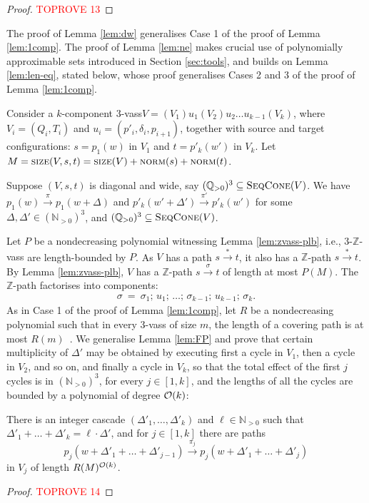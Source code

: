 \documentclass[a4paper, UKenglish, cleveref, autoref, thm-restate]{lipics-v2021}
\newcommand{\sandwich}{polynomially approximable\xspace}
\newcommand{\N}{\mathbb{N}}
\newcommand{\Z}{\mathbb{Z}}
\newcommand{\Q}{\mathbb{Q}}
\newcommand{\Qpos}{\Q_{>0}}
\newcommand{\trans}[1]{\stackrel{#1}{\longrightarrow}}
\newcommand{\tran}{\trans{*}}
\newcommand{\norm}{\textsc{norm}}
\newcommand{\size}{\textsc{size}}
\newcommand{\lb}{length-bounded\xspace}
\newcommand{\OO}{{\cal O}}
\newcommand{\vass}{{\sc vass}\xspace}
\newcommand{\tvass}{\parvass 3}
\newcommand{\tzvass}{\parzvass 3}
\newcommand{\parvass}[1]{{$#1$-\vass}\xspace}
\newcommand{\parzvass}[1]{{$#1$-$\Z$-\vass}\xspace}
\newcommand{\ktvass}{(V_1) u_1 (V_2) u_2 \ldots u_{k-1} (V_k)}
\newcommand{\setfromto}[2]{[#1, #2]}
\newcommand{\setto}[1]{\setfromto 1 {#1}}
\newcommand{\seqcone}[1]{\textsc{SeqCone}(#1)}
\newcommand{\Npos}{\N_{>0}}
\begin{document}
\begin{proof}\textcolor{red}{TOPROVE 13}\end{proof}


The proof of Lemma \ref{lem:dw} generalises Case 1 of the proof of Lemma \ref{lem:1comp}.
The proof of Lemma \ref{lem:ne} makes crucial use of \sandwich sets introduced
in Section \ref{sec:tools}, and builds on 
Lemma \ref{lem:len-eq}, stated below, whose proof 
generalises Cases 2 and 3 of the proof of Lemma \ref{lem:1comp}.


\begin{appendixproof}
Consider a $k$-component \tvass  $V = \ktvass$,
where $V_i = (Q_i, T_i)$ and $u_i = (p'_i, \delta_i, p_{i+1})$,
together with source and target configurations: 
$s=p_1(w)$ in $V_1$ and $t=p'_k(w')$ in $V_k$.
Let $M = \size(V, s, t) = \size(V) + \norm(s) + \norm(t)$.

Suppose $(V, s, t)$ is diagonal and wide, say $(\Qpos)^3 \subseteq \seqcone{V}$.
We have
$p_1(w) \trans\pi p_1(w+\Delta)$ and
$p'_k(w'+\Delta')\trans{\pi'} p'_k(w')$  for some $\Delta,\Delta'\in(\Npos)^3$, and 
$(\Qpos)^3 \subseteq \seqcone V$.


Let $P$ be a nondecreasing polynomial witnessing Lemma \ref{lem:zvass-plb}, i.e.,
\tzvass are \lb by $P$.
As $V$ has a path $s \tran t$, it also has a $\Z$-path $s\tran t$.
By Lemma \ref{lem:zvass-plb}, $V$ has a $\Z$-path $s \trans{\sigma} t$ of length at most $P(M)$.
The $\Z$-path factorises into components:
\begin{align} \label{eq:Zpath}
\sigma \ = \ 
\sigma_1;\, u_1; \, \ldots; \, \sigma_{k-1}; \, u_{k-1}; \, \sigma_k.
\end{align}
As in Case 1 of the proof of Lemma \ref{lem:1comp},
let $R$ be a nondecreasing polynomial  such that in every \tvass of size $m$, the length of a covering
path is at most $R(m)$~\cite[Lemma~3.4]{DBLP:journals/tcs/Rackoff78}.
We generalise Lemma \ref{lem:FP} and prove that certain multiplicity of $\Delta'$
may be obtained by executing first a cycle in $V_1$, then a cycle in $V_2$, and so on,
and finally a cycle in $V_k$, so that the total effect of the first $j$ cycles is in $(\Npos)^3$,
for every $j\in\setto k$,
and the lengths of all the cycles are bounded by a polynomial of degree $\OO(k)$:
\begin{lemma} \label{lem:FPgen}
There is an integer cascade $(\Delta'_1, \ldots, \Delta'_k)$ and $\ell\in\Npos$ such that
$\Delta'_1 + \ldots + \Delta'_k = \ell\cdot\Delta'$, 
and for $j\in\setto k$ there are paths
\[
p_j(w+\Delta'_1 + \ldots + \Delta'_{j-1}) \trans {\pi_j}  p_j(w+ \Delta'_1 + \ldots + \Delta'_{j})
\]
in $V_j$
of length $R(M)^{\OO(k)}$.
\end{lemma}
\begin{proof}\textcolor{red}{TOPROVE 14}\end{proof}


\end{appendixproof}
\end{document}
